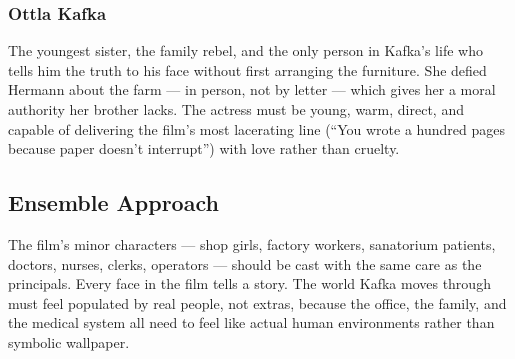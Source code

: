 \subsubsection{Ottla Kafka}
The youngest sister, the family rebel, and the only person in Kafka's life who tells him the truth to his face without first arranging the furniture. She defied Hermann about the farm --- in person, not by letter --- which gives her a moral authority her brother lacks. The actress must be young, warm, direct, and capable of delivering the film's most lacerating line (``You wrote a hundred pages because paper doesn't interrupt'') with love rather than cruelty.

\subsection{Ensemble Approach}

The film's minor characters --- shop girls, factory workers, sanatorium patients, doctors, nurses, clerks, operators --- should be cast with the same care as the principals. Every face in the film tells a story. The world Kafka moves through must feel populated by real people, not extras, because the office, the family, and the medical system all need to feel like actual human environments rather than symbolic wallpaper.
